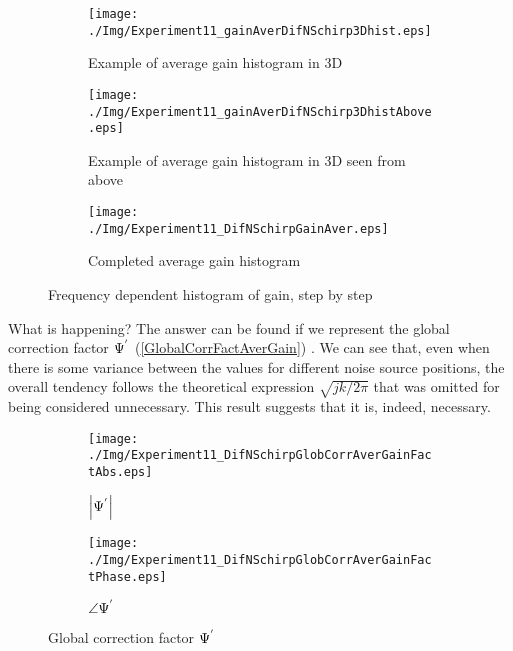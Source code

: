 \begin{figure}[h]
	\centering
	\begin{subfigure}[b]{0.49\textwidth}
	\centering
	\texttt{[image: ./Img/Experiment11\_gainAverDifNSchirp3Dhist.eps]}
	\caption{Example of average gain histogram in 3D}
	\label{histogram3D}
	\end{subfigure}
	\begin{subfigure}[b]{0.49\textwidth}
		\centering
		\texttt{[image: ./Img/Experiment11\_gainAverDifNSchirp3DhistAbove.eps]}
		\caption{Example of average gain histogram in 3D seen from above}
		\label{histogram3Dabove}
	\end{subfigure}
	\begin{subfigure}[b]{0.49\textwidth}
		\centering	\texttt{[image: ./Img/Experiment11\_DifNSchirpGainAver.eps]}
		\caption{Completed average gain histogram}
		\label{histogramGainAverDifNS}
	\end{subfigure}
\caption{Frequency dependent histogram of gain, step by step}
\end{figure}

What is happening? The answer can be found if we represent the global correction factor $\Psi^{'}$ (\autoref{GlobalCorrFactAverGain}) . We can see that, even when there is some variance between the values for different noise source positions, the overall tendency follows the theoretical expression $\sqrt{jk/2\pi}$ that was omitted for being considered unnecessary. This result suggests that it is, indeed, necessary.

\begin{figure}[h]
	\begin{subfigure}[b]{0.49\textwidth}
		\centering
		\texttt{[image: ./Img/Experiment11\_DifNSchirpGlobCorrAverGainFactAbs.eps]}
		\caption{$\left| \Psi^{'} \right|$}
		\label{GlobalCorrFactAbsAverGain}
	\end{subfigure}
	\begin{subfigure}[b]{0.49\textwidth}
		\centering
		\texttt{[image: ./Img/Experiment11\_DifNSchirpGlobCorrAverGainFactPhase.eps]}
		\caption{$\angle{\Psi^{'}}$}
		\label{GlobalCorrFactPhaseAverGain}
	\end{subfigure}
\caption{Global correction factor $\Psi^{'}$}
\label{GlobalCorrFactAverGain}
\end{figure}

